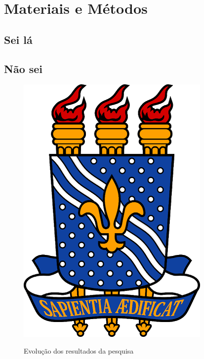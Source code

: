 \chapter{Materiais e Métodos}

\section{Sei lá}

\section{Não sei}

\begin{figure}
    \centering
    \caption{Evolução dos resultados da pesquisa}
    \includegraphics[scale=0.3]{config/logo-ufpb.png}
    \label{fig:my_fig}
\end{figure}


